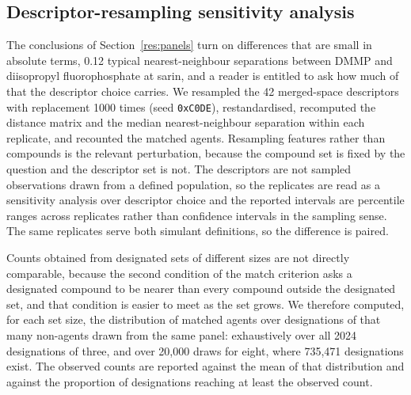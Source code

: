 \documentclass[1p,times]{elsarticle}
\begin{document}
\subsection{Descriptor-resampling sensitivity analysis}
\label{meth:dboot}
The conclusions of Section~\ref{res:panels} turn on differences that are small
in absolute terms, 0.12 typical nearest-neighbour separations between DMMP and
diisopropyl fluorophosphate at sarin, and a reader is entitled to ask how much
of that the descriptor choice carries. We resampled the 42 merged-space
descriptors with replacement 1000 times (seed \texttt{0xC0DE}), restandardised,
recomputed the distance matrix and the median nearest-neighbour separation
within each replicate, and recounted the matched agents. Resampling features
rather than compounds is the relevant perturbation, because the compound set is
fixed by the question and the descriptor set is not. The descriptors are not
sampled observations drawn from a defined population, so the replicates are
read as a sensitivity analysis over descriptor choice and the reported
intervals are percentile ranges across replicates rather than confidence
intervals in the sampling sense. The same replicates serve
both simulant definitions, so the difference is paired.

Counts obtained from designated sets of different sizes are not directly
comparable, because the second condition of the match criterion asks a
designated compound to be nearer than every compound outside the designated
set, and that condition is easier to meet as the set grows. We therefore
computed, for each set size, the distribution of matched agents over
designations of that many non-agents drawn from the same panel: exhaustively
over all 2024 designations of three, and over 20,000 draws for eight, where
735,471 designations exist. The observed counts are reported against the mean
of that distribution and against the proportion of designations reaching at
least the observed count.
\end{document}
